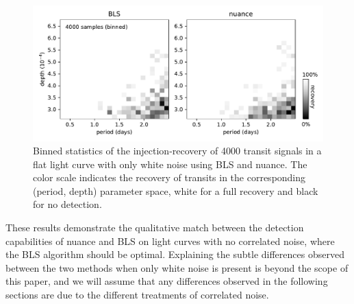 \documentclass[modern]{aastex631}
\newcommand{\nuancecode}{\textsf{nuance}}
\begin{document}
\begin{figure}[H]
    \begin{centering}
        \includegraphics[width=\linewidth]{../workflows/control_test_bls/figures/control_test.pdf}
        \caption{Binned statistics of the injection-recovery of 4000 transit signals in a flat light curve with only white noise using \textsf{BLS} and \nuancecode{}. The color scale indicates the recovery of transits in the corresponding (period, depth) parameter space, white for a full recovery and black for no detection.}
        \label{fig:control}
    \end{centering}
\end{figure}

These results demonstrate the qualitative match between the detection capabilities of \textsf{nuance} and \textsf{BLS} on light curves with no correlated noise, where the \textsf{BLS} algorithm should be optimal. Explaining the subtle differences observed between the two methods when only white noise is present is beyond the scope of this paper, and we will assume that any differences observed in the following sections are due to the different treatments of correlated noise.

\newpage
\end{document}
